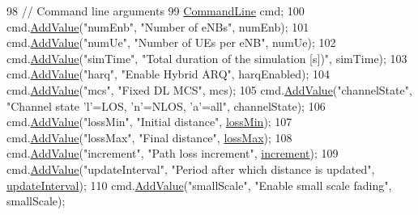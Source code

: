 \begin{DoxyCode}
98         \textcolor{comment}{// Command line arguments}
99         \hyperlink{classns3_1_1CommandLine}{CommandLine} cmd;
100         cmd.\hyperlink{classns3_1_1CommandLine_addcfb546c7ad4c8bd0965654d55beb8e}{AddValue}(\textcolor{stringliteral}{"numEnb"}, \textcolor{stringliteral}{"Number of eNBs"}, numEnb);
101         cmd.\hyperlink{classns3_1_1CommandLine_addcfb546c7ad4c8bd0965654d55beb8e}{AddValue}(\textcolor{stringliteral}{"numUe"}, \textcolor{stringliteral}{"Number of UEs per eNB"}, numUe);
102         cmd.\hyperlink{classns3_1_1CommandLine_addcfb546c7ad4c8bd0965654d55beb8e}{AddValue}(\textcolor{stringliteral}{"simTime"}, \textcolor{stringliteral}{"Total duration of the simulation [s])"}, simTime);
103         cmd.\hyperlink{classns3_1_1CommandLine_addcfb546c7ad4c8bd0965654d55beb8e}{AddValue}(\textcolor{stringliteral}{"harq"}, \textcolor{stringliteral}{"Enable Hybrid ARQ"}, harqEnabled);
104         cmd.\hyperlink{classns3_1_1CommandLine_addcfb546c7ad4c8bd0965654d55beb8e}{AddValue}(\textcolor{stringliteral}{"mcs"}, \textcolor{stringliteral}{"Fixed DL MCS"}, mcs);
105         cmd.\hyperlink{classns3_1_1CommandLine_addcfb546c7ad4c8bd0965654d55beb8e}{AddValue}(\textcolor{stringliteral}{"channelState"}, \textcolor{stringliteral}{"Channel state 'l'=LOS, 'n'=NLOS, 'a'=all"}, channelState);
106         cmd.\hyperlink{classns3_1_1CommandLine_addcfb546c7ad4c8bd0965654d55beb8e}{AddValue}(\textcolor{stringliteral}{"lossMin"}, \textcolor{stringliteral}{"Initial distance"}, \hyperlink{mmwave-amc-test2_8cc_a9ca00a53092f2e9430cb7f39c9831c11}{lossMin});
107         cmd.\hyperlink{classns3_1_1CommandLine_addcfb546c7ad4c8bd0965654d55beb8e}{AddValue}(\textcolor{stringliteral}{"lossMax"}, \textcolor{stringliteral}{"Final distance"}, \hyperlink{mmwave-amc-test2_8cc_a3af69feb20a1e00eb0e56f03d201302d}{lossMax});
108         cmd.\hyperlink{classns3_1_1CommandLine_addcfb546c7ad4c8bd0965654d55beb8e}{AddValue}(\textcolor{stringliteral}{"increment"}, \textcolor{stringliteral}{"Path loss increment"}, \hyperlink{mmwave-amc-test2_8cc_ac504dff76b24ab9f15536c51aec9fbbb}{increment});
109         cmd.\hyperlink{classns3_1_1CommandLine_addcfb546c7ad4c8bd0965654d55beb8e}{AddValue}(\textcolor{stringliteral}{"updateInterval"}, \textcolor{stringliteral}{"Period after which distance is updated"}, 
      \hyperlink{mmwave-amc-test2_8cc_adb43d41f676710da0bfbc1ca090e3076}{updateInterval});
110         cmd.\hyperlink{classns3_1_1CommandLine_addcfb546c7ad4c8bd0965654d55beb8e}{AddValue}(\textcolor{stringliteral}{"smallScale"}, \textcolor{stringliteral}{"Enable small scale fading"}, smallScale);

\end{DoxyCode}

